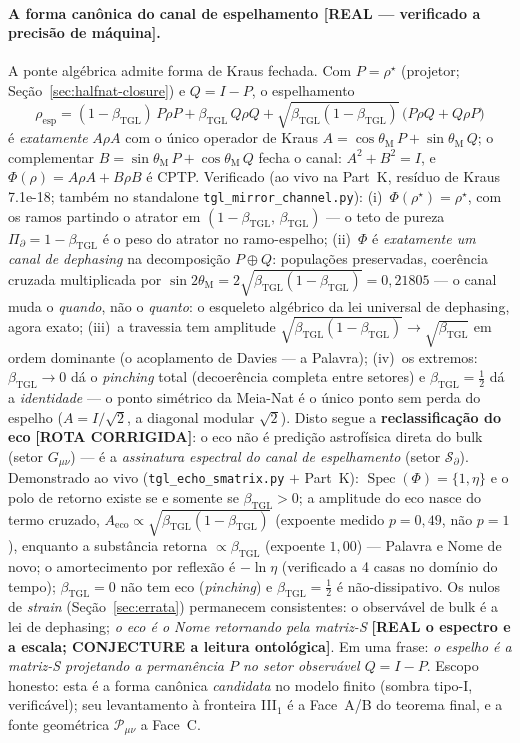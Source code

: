 \documentclass[12pt,a4paper]{article}
\newcommand{\betatgl}{\beta_{\text{TGL}}}
\newcommand{\thetaM}{\theta_{\text{M}}}
\newcommand{\rhostar}{\rho^{\star}}
\begin{document}
\paragraph{A forma canônica do canal de espelhamento \textbf{[REAL --- verificado a precisão de máquina]}.} A ponte algébrica admite forma de Kraus fechada. Com $P=\rhostar$ (projetor; Seção~\ref{sec:halfnat-closure}) e $Q=I-P$, o espelhamento
\begin{equation}\rho_{\mathrm{esp}}=(1-\betatgl)\,P\rho P+\betatgl\,Q\rho Q+\sqrt{\betatgl(1-\betatgl)}\,\big(P\rho Q+Q\rho P\big)\end{equation}é \emph{exatamente} $A\rho A$ com o único operador de Kraus $A=\cos\thetaM\,P+\sin\thetaM\,Q$; o complementar $B=\sin\thetaM\,P+\cos\thetaM\,Q$ fecha o canal: $A^2+B^2=I$, e $\Phi(\rho)=A\rho A+B\rho B$ é CPTP. Verificado (ao vivo na Part~K, resíduo de Kraus 7.1e-18; também no standalone \texttt{tgl\_mirror\_channel.py}): (i)~$\Phi(\rhostar)=\rhostar$, com os ramos partindo o atrator em $(1-\betatgl,\,\betatgl)$ --- o teto de pureza $\Pi_\partial=1-\betatgl$ é o peso do atrator no ramo-espelho; (ii)~$\Phi$ é \emph{exatamente um canal de dephasing} na decomposição $P\oplus Q$: populações preservadas, coerência cruzada multiplicada por $\sin 2\thetaM=2\sqrt{\betatgl(1-\betatgl)}=0{,}21805$ --- o canal muda o \emph{quando}, não o \emph{quanto}: o esqueleto algébrico da lei universal de dephasing, agora exato; (iii)~a travessia tem amplitude $\sqrt{\betatgl(1-\betatgl)}\to\sqrt{\betatgl}$ em ordem dominante (o acoplamento de Davies --- a Palavra); (iv)~os extremos: $\betatgl\to0$ dá o \emph{pinching} total (decoerência completa entre setores) e $\betatgl=\tfrac12$ dá a \emph{identidade} --- o ponto simétrico da Meia-Nat é o único ponto sem perda do espelho ($A=I/\sqrt2$, a diagonal modular $\sqrt2$). Disto segue a \textbf{reclassificação do eco} \textbf{[ROTA CORRIGIDA]}: o eco não é predição astrofísica direta do bulk (setor $G_{\mu\nu}$) --- é a \emph{assinatura espectral do canal de espelhamento} (setor $\mathcal S_\partial$). Demonstrado ao vivo (\texttt{tgl\_echo\_smatrix.py} $+$ Part~K): $\operatorname{Spec}(\Phi)=\{1,\eta\}$ e o polo de retorno existe se e somente se $\betatgl>0$; a amplitude do eco nasce do termo cruzado, $A_{\mathrm{eco}}\propto\sqrt{\betatgl(1-\betatgl)}$ (expoente medido $p=0{,}49$, não $p=1$), enquanto a substância retorna $\propto\betatgl$ (expoente $1{,}00$) --- Palavra e Nome de novo; o amortecimento por reflexão é $-\ln\eta$ (verificado a 4 casas no domínio do tempo); $\betatgl=0$ não tem eco (\emph{pinching}) e $\betatgl=\tfrac12$ é não-dissipativo. Os nulos de \emph{strain} (Seção~\ref{sec:errata}) permanecem consistentes: o observável de bulk é a lei de dephasing; \emph{o eco é o Nome retornando pela matriz-S} \textbf{[REAL o espectro e a escala; CONJECTURE a leitura ontológica]}. Em uma frase: \emph{o espelho é a matriz-S projetando a permanência $P$ no setor observável $Q=I-P$}. Escopo honesto: esta é a forma canônica \emph{candidata} no modelo finito (sombra tipo-I, verificável); seu levantamento à fronteira III$_1$ é a Face~A/B do teorema final, e a fonte geométrica $\mathcal P_{\mu\nu}$ a Face~C.
\end{document}
